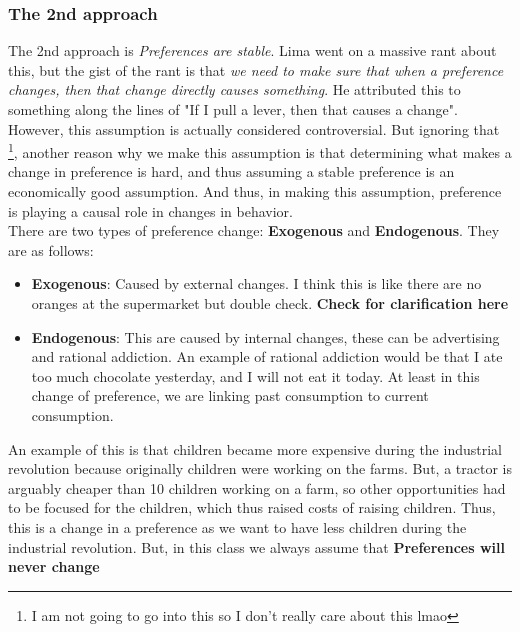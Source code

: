 \documentclass{article}
\begin{document}
\subsubsection{The 2nd approach}
The 2nd approach is \textit{Preferences are stable}. Lima went on a massive rant about this, but the gist of the rant is that \textit{we need to make sure that when a preference changes, then that change directly causes something}. He attributed this to something along the lines of "If I pull a lever, then that causes a change". However, this assumption is actually considered controversial. But ignoring that \footnote{I am not going to go into this so I don't really care about this lmao}, another reason why we make this assumption is that determining what makes a change in preference is hard, and thus assuming a stable preference is an economically good assumption. And thus, in making this assumption, preference is playing a causal role in changes in behavior. \\

\noindent
There are two types of preference change: \textbf{Exogenous} and \textbf{Endogenous}. They are as follows:
\begin{itemize}
    \item \textbf{Exogenous}: Caused by external changes. I think this is like there are no oranges at the supermarket but double check. \textbf{Check for clarification here}
    \item \textbf{Endogenous}: This are caused by internal changes, these can be advertising and rational addiction. An example of rational addiction would be that I ate too much chocolate yesterday, and I will not eat it today. At least in this change of preference, we are linking past consumption to current consumption.
\end{itemize}
An example of this is that children became more expensive during the industrial revolution because originally children were working on the farms. But, a tractor is arguably cheaper than 10 children working on a farm, so other opportunities had to be focused for the children, which thus raised costs of raising children. Thus, this is a change in a preference as we want to have less children during the industrial revolution. But, in this class we always assume that \textbf{Preferences will never change}
\end{document}
